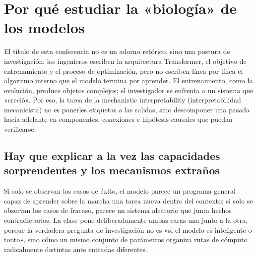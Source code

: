\section{Por qué estudiar la «biología» de los modelos}

El título de esta conferencia no es un adorno retórico, sino una postura de investigación: los ingenieros escriben la arquitectura Transformer, el objetivo de entrenamiento y el proceso de optimización, pero no escriben línea por línea el algoritmo interno que el modelo termina por aprender. El entrenamiento, como la evolución, produce objetos complejos; el investigador se enfrenta a un sistema que «creció». Por eso, la tarea de la mechanistic interpretability (interpretabilidad mecanicista) no es ponerles etiquetas a las salidas, sino descomponer una pasada hacia adelante en componentes, conexiones e hipótesis causales que puedan verificarse.



\subsection{Hay que explicar a la vez las capacidades sorprendentes y los mecanismos extraños}

Si solo se observan los casos de éxito, el modelo parece un programa general capaz de aprender sobre la marcha una tarea nueva dentro del contexto; si solo se observan los casos de fracaso, parece un sistema aleatorio que junta hechos contradictorios. La clase pone deliberadamente ambas caras una junto a la otra, porque la verdadera pregunta de investigación no es «si el modelo es inteligente o tonto», sino cómo un mismo conjunto de parámetros organiza rutas de cómputo radicalmente distintas ante entradas diferentes.


